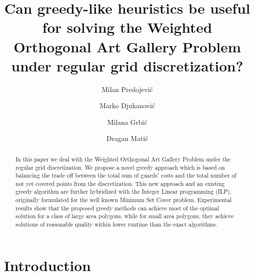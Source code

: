 \documentclass[runningheads,a4paper]{elsarticle}
\begin{document}
	
	
	\title{Can greedy-like heuristics be useful for solving the Weighted Orthogonal Art Gallery Problem under regular grid discretization?}
	
	\author[1]{Milan Predojevi\'c}
\author[1]{Marko Djukanovi\'c}
\author[1]{Milana Grbi\'c}
\author[1]{Dragan Mati\'c}
    \address[1]{Faculty of Natural Science and Mathematics, University of Banja Luka, Bosnia and Herzegovina}

	\begin{abstract}
		In this paper we deal with the Weighted Orthogonal Art Gallery Problem under the regular grid discretization. We propose a novel greedy approach which is based on balancing the trade off between the total sum of guards' costs and the total number of not yet covered points from the discretization. This new approach and an existing greedy algorithm are further  hybridized with the Integer Linear programming (ILP), originally formulated for the well known Minimum Set Cover problem. Experimental results show that the proposed greedy methods can achieve most of the optimal solution for a class of large area polygons, while for small area polygons, they achieve solutions of reasonable quality within lower runtime than the exact algorithms.
	\end{abstract}
	\maketitle
	
	
	\section{Introduction}\label{sec:introduction}
	
\end{document}
